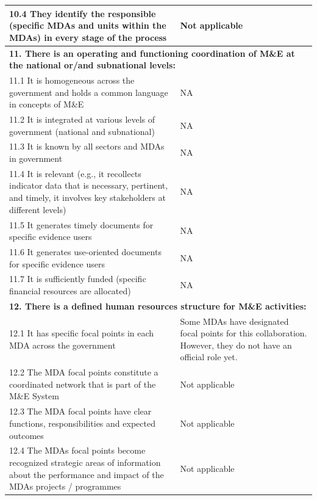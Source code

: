 \documentclass[
  10pt,
]{book}
\begin{document}
\begin{table}
\begin{tabular}[t]{l|l}
\hline
\hspace{1em}10.4 They identify the responsible (specific MDAs and units within the MDAs) in every stage of the process & Not applicable\\
\hline
\multicolumn{2}{l}{\textbf{11. There is an operating and functioning coordination of M\&E at the national or/and subnational levels:}}\\
\hline
\hspace{1em}11.1 It is homogeneous across the government and holds a common language in concepts of M\&E & NA\\
\hline
\hspace{1em}11.2 It is integrated at various levels of government (national and subnational) & NA\\
\hline
\hspace{1em}11.3 It is known by all sectors and MDAs in government & NA\\
\hline
\hspace{1em}11.4 It is relevant (e.g., it recollects indicator data that is necessary, pertinent, and timely, it involves key stakeholders at different levels) & NA\\
\hline
\hspace{1em}11.5 It generates timely documents for specific evidence users & NA\\
\hline
\hspace{1em}11.6 It generates use-oriented documents for specific evidence users & NA\\
\hline
\hspace{1em}11.7 It is sufficiently funded (specific financial resources are allocated) & NA\\
\hline
\multicolumn{2}{l}{\textbf{12. There is a defined human resources structure for M\&E activities:}}\\
\hline
\hspace{1em}12.1 It has specific focal points in each MDA across the government & Some MDAs have designated focal points for this collaboration. However, they do not have an official role yet.\\
\hline
\hspace{1em}12.2 The MDA focal points constitute a coordinated network that is part of the M\&E System & Not applicable\\
\hline
\hspace{1em}12.3 The MDA focal points have clear functions, responsibilities and expected outcomes & Not applicable\\
\hline
\hspace{1em}12.4 The MDAs focal points become recognized strategic areas of information about the performance and impact of the MDAs projects / programmes & Not applicable\\
\hline
\end{tabular}
\end{table}
\end{document}
